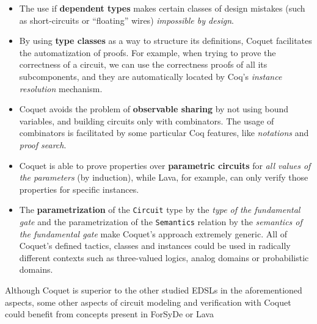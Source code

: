             \begin{itemize}
                \item The use if \textbf{dependent types} makes certain classes of design mistakes
                    (such as short-circuits or ``floating'' wires) \emph{impossible by design}.

                \item By using \textbf{type classes} as a way to structure its definitions, Coquet
                    facilitates the automatization of proofs. For example, when trying to prove the
                    correctness of a circuit, we can use the correctness proofs of all its
                    subcomponents, and they are automatically located by Coq's \emph{instance
                        resolution} mechanism.

                \item Coquet avoids the problem of \textbf{observable sharing} by not using bound
                    variables, and building circuits only with combinators. The usage of combinators
                    is facilitated by some particular Coq features, like \emph{notations} and
                    \emph{proof search}.

                \item Coquet is able to prove properties over \textbf{parametric circuits} for
                    \emph{all values of the parameters} (by induction), while Lava, for example, can
                    only verify those properties for specific instances.

                \item The \textbf{parametrization} of the \texttt{Circuit} type by the \emph{type of
                        the fundamental gate} and the parametrization of the \texttt{Semantics}
                    relation by the \emph{semantics of the fundamental gate} make Coquet's approach
                    extremely generic. All of Coquet's defined tactics, classes and instances could
                    be used in radically different contexts such as three-valued logics, analog
                    domains or probabilistic domains.
            \end{itemize}

            Although Coquet is superior to the other studied EDSLs in the aforementioned aspects,
            some other aspects of circuit modeling and verification with Coquet could benefit from
            concepts present in ForSyDe or Lava

